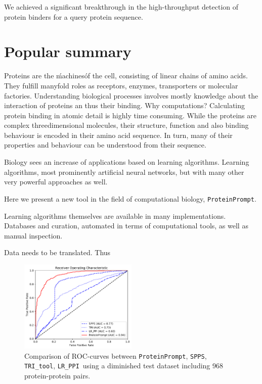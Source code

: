\documentclass{article}
\newcommand{\spps}{\texttt{SPPS}}
\newcommand{\tri}{\texttt{TRI\_tool}}
\newcommand{\lr}{\texttt{LR\_PPI}}
\newcommand{\toolblank}{\texttt{ProteinPrompt}}
\newcommand{\tool}{\toolblank\hspace{2pt}}
\begin{document}
We achieved a significant breakthrough in the high-throughput detection of protein binders for a query protein sequence.


\section*{Popular summary}

Proteins are the \'machines\' of the cell, consisting of linear chains of amino acids. They fulfill manyfold roles as receptors, enzymes, transporters or molecular factories. Understanding biological processes involves mostly knowledge about the interaction of proteins an thus their binding.
Why computations?
Calculating protein binding in atomic detail is highly time consuming.
While the proteins are complex threedimensional molecules, their structure, function and also binding behaviour is encoded in their amino acid sequence. In turn, many of their properties and behaviour can be understood from their sequence.


Biology sees an increase of applications based on learning algorithms. Learning algorithms, most prominently artificial neural networks, but with many other very powerful approaches as well. 


Here we present a new tool in the field of computational biology, \tool. 


Learning algorithms themselves are available in many implementations.
Databases and curation, automated in terms of computational tools, as well as manual inspection.

Data needs to be translated. Thus 



\begin{figure}
  \includegraphics[width=0.5\textwidth]{img/comparison_roc.pdf}
  \caption{Comparison of ROC-curves between \tool, \spps, \tri, \lr\ 
    using a diminished test dataset including 968
    protein-protein pairs.}
  \label{fig:comparison}
\end{figure}
\end{document}
